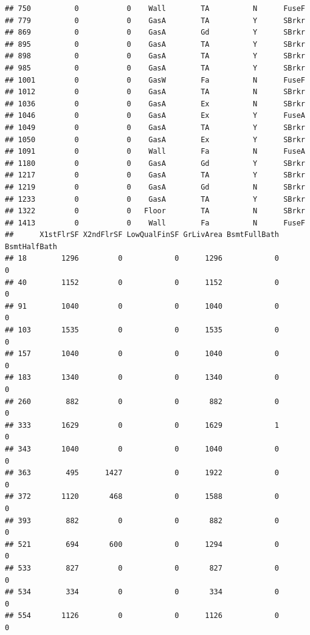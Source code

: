 \documentclass[]{article}
\begin{document}
\begin{verbatim}
## 750          0           0    Wall        TA          N      FuseF
## 779          0           0    GasA        TA          Y      SBrkr
## 869          0           0    GasA        Gd          Y      SBrkr
## 895          0           0    GasA        TA          Y      SBrkr
## 898          0           0    GasA        TA          Y      SBrkr
## 985          0           0    GasA        TA          Y      SBrkr
## 1001         0           0    GasW        Fa          N      FuseF
## 1012         0           0    GasA        TA          N      SBrkr
## 1036         0           0    GasA        Ex          N      SBrkr
## 1046         0           0    GasA        Ex          Y      FuseA
## 1049         0           0    GasA        TA          Y      SBrkr
## 1050         0           0    GasA        Ex          Y      SBrkr
## 1091         0           0    Wall        Fa          N      FuseA
## 1180         0           0    GasA        Gd          Y      SBrkr
## 1217         0           0    GasA        TA          Y      SBrkr
## 1219         0           0    GasA        Gd          N      SBrkr
## 1233         0           0    GasA        TA          Y      SBrkr
## 1322         0           0   Floor        TA          N      SBrkr
## 1413         0           0    Wall        Fa          N      FuseF
##      X1stFlrSF X2ndFlrSF LowQualFinSF GrLivArea BsmtFullBath BsmtHalfBath
## 18        1296         0            0      1296            0            0
## 40        1152         0            0      1152            0            0
## 91        1040         0            0      1040            0            0
## 103       1535         0            0      1535            0            0
## 157       1040         0            0      1040            0            0
## 183       1340         0            0      1340            0            0
## 260        882         0            0       882            0            0
## 333       1629         0            0      1629            1            0
## 343       1040         0            0      1040            0            0
## 363        495      1427            0      1922            0            0
## 372       1120       468            0      1588            0            0
## 393        882         0            0       882            0            0
## 521        694       600            0      1294            0            0
## 533        827         0            0       827            0            0
## 534        334         0            0       334            0            0
## 554       1126         0            0      1126            0            0

\end{verbatim}
\end{document}
